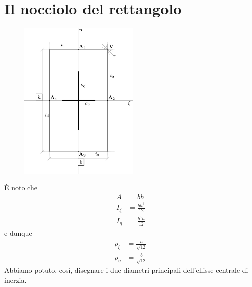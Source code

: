 \section{Il nocciolo del rettangolo}
\renewcommand{\thefigure}{6~-~7}
\begin{figure}[ht]
\centering
\includegraphics[width=0.51\textwidth]{Immagini/Parte_6/Figura6_7/Figura6_7.pdf}
\caption{}
\label{figura6-7}
\end{figure}
\noindent È noto che 
\begin{align*}
A &= bh \\ 
I_{\xi} &= \frac{bh^{3}}{12} \\
I_{\eta} &= \frac{b^{3}h}{12}
\end{align*}
e dunque 
\begin{align*}
\rho_{\xi} &= \frac{h}{\sqrt{12}} \\
\rho_{\eta} &= \frac{b}{\sqrt{12}}
\end{align*}
\noindent Abbiamo potuto, così, disegnare i due diametri principali dell'ellisse centrale di inerzia. 

